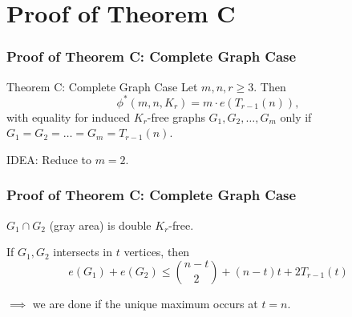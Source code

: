 \documentclass{beamer}
\begin{document}
\section{Proof of Theorem C}

\begin{frame}
  \frametitle{Proof of Theorem C: Complete Graph Case}

  \begin{block}{Theorem C: Complete Graph Case}
    Let $m, n, r \geq 3$. Then 
    \[
      \phi^*(m, n, K_{r}) = m \cdot e(T_{r - 1}(n)),
    \]
    with equality for induced $K_{r}$-free graphs $G_1, G_2, \dots, G_m$ only if $G_1 = G_2 = \dots = G_m = T_{r - 1}(n)$. 
  \end{block}

  \pause

  \vspace{0.7cm}

  IDEA: Reduce to $m = 2$.
\end{frame}

\begin{frame}
  \frametitle{Proof of Theorem C: Complete Graph Case}

  \begin{center}
  \end{center}

  \pause

  $G_1 \cap G_2$ (gray area) is double $K_r$-free.

  \pause

  \vspace{0.5cm}

  If $G_1, G_2$ intersects in $t$ vertices, then
  \[
    e(G_1) + e(G_2) \leq \binom{n - t}{2} + (n - t)t + 2T_{r - 1}(t)
  \]

  \pause

  $\implies$ we are done if the unique maximum occurs at $t = n$.
\end{frame}
\end{document}
